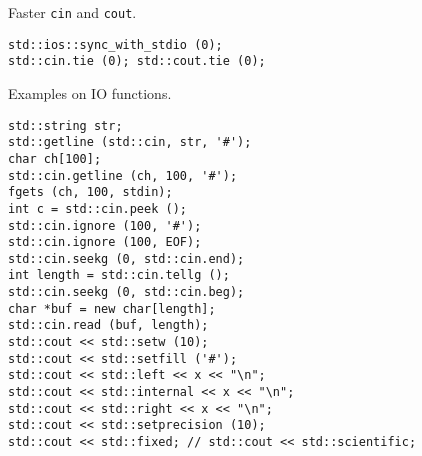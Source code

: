 Faster \texttt{cin} and \texttt{cout}.
\begin{lstlisting}
std::ios::sync_with_stdio (0);
std::cin.tie (0); std::cout.tie (0);
\end{lstlisting}

Examples on IO functions.
\begin{lstlisting}
std::string str;
std::getline (std::cin, str, '#');
char ch[100];
std::cin.getline (ch, 100, '#');
fgets (ch, 100, stdin);
int c = std::cin.peek ();
std::cin.ignore (100, '#');
std::cin.ignore (100, EOF);
std::cin.seekg (0, std::cin.end);
int length = std::cin.tellg ();
std::cin.seekg (0, std::cin.beg);
char *buf = new char[length];
std::cin.read (buf, length);
std::cout << std::setw (10);
std::cout << std::setfill ('#');
std::cout << std::left << x << "\n";
std::cout << std::internal << x << "\n";
std::cout << std::right << x << "\n";
std::cout << std::setprecision (10);
std::cout << std::fixed; // std::cout << std::scientific;
\end{lstlisting}

